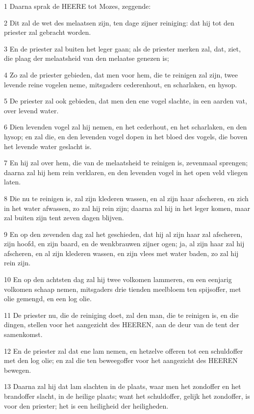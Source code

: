 \par 1 Daarna sprak de HEERE tot Mozes, zeggende:
\par 2 Dit zal de wet des melaatsen zijn, ten dage zijner reiniging: dat hij tot den priester zal gebracht worden.
\par 3 En de priester zal buiten het leger gaan; als de priester merken zal, dat, ziet, die plaag der melaatsheid van den melaatse genezen is;
\par 4 Zo zal de priester gebieden, dat men voor hem, die te reinigen zal zijn, twee levende reine vogelen neme, mitsgaders cederenhout, en scharlaken, en hysop.
\par 5 De priester zal ook gebieden, dat men den ene vogel slachte, in een aarden vat, over levend water.
\par 6 Dien levenden vogel zal hij nemen, en het cederhout, en het scharlaken, en den hysop; en zal die, en den levenden vogel dopen in het bloed des vogels, die boven het levende water geslacht is.
\par 7 En hij zal over hem, die van de melaatsheid te reinigen is, zevenmaal sprengen; daarna zal hij hem rein verklaren, en den levenden vogel in het open veld vliegen laten.
\par 8 Die nu te reinigen is, zal zijn klederen wassen, en al zijn haar afscheren, en zich in het water afwassen, zo zal hij rein zijn; daarna zal hij in het leger komen, maar zal buiten zijn tent zeven dagen blijven.
\par 9 En op den zevenden dag zal het geschieden, dat hij al zijn haar zal afscheren, zijn hoofd, en zijn baard, en de wenkbrauwen zijner ogen; ja, al zijn haar zal hij afscheren, en al zijn klederen wassen, en zijn vlees met water baden, zo zal hij rein zijn.
\par 10 En op den achtsten dag zal hij twee volkomen lammeren, en een eenjarig volkomen schaap nemen, mitsgaders drie tienden meelbloem ten spijsoffer, met olie gemengd, en een log olie.
\par 11 De priester nu, die de reiniging doet, zal den man, die te reinigen is, en die dingen, stellen voor het aangezicht des HEEREN, aan de deur van de tent der samenkomst.
\par 12 En de priester zal dat ene lam nemen, en hetzelve offeren tot een schuldoffer met den log olie; en zal die ten beweegoffer voor het aangezicht des HEEREN bewegen.
\par 13 Daarna zal hij dat lam slachten in de plaats, waar men het zondoffer en het brandoffer slacht, in de heilige plaats; want het schuldoffer, gelijk het zondoffer, is voor den priester; het is een heiligheid der heiligheden.
